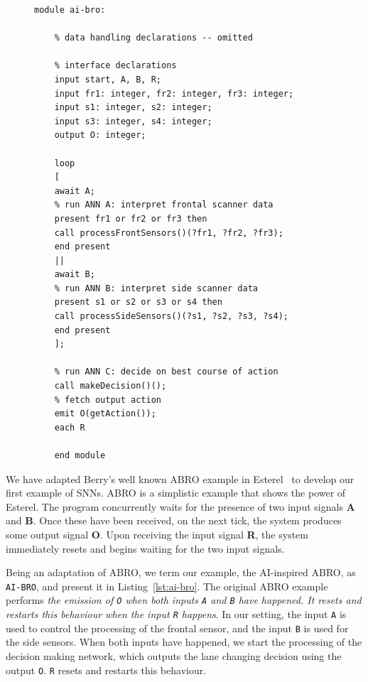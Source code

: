 \begin{figure}[h]
	\begin{lstlisting}[caption={Esterel implementation of \texttt{AI-BRO}},label={lst:ai-bro}]
	module ai-bro:
	
	% data handling declarations -- omitted 
	
	% interface declarations
	input start, A, B, R;
	input fr1: integer, fr2: integer, fr3: integer;
	input s1: integer, s2: integer;
	input s3: integer, s4: integer;
	output O: integer;
	
	loop
	[
	await A;
	% run ANN A: interpret frontal scanner data
	present fr1 or fr2 or fr3 then
	call processFrontSensors()(?fr1, ?fr2, ?fr3);
	end present
	||
	await B;
	% run ANN B: interpret side scanner data
	present s1 or s2 or s3 or s4 then
	call processSideSensors()(?s1, ?s2, ?s3, ?s4);
	end present
	];
	
	% run ANN C: decide on best course of action 
	call makeDecision()();
	% fetch output action
	emit O(getAction());
	each R
	
	end module
	\end{lstlisting}
\end{figure}

We have adapted Berry's well known ABRO example in Esterel~\cite{berry2000foundations} to develop our first example of 
\acp{SNN}.
ABRO is a simplistic example that shows the power of Esterel.
The program concurrently waits for the presence of two input signals \textbf{A} and \textbf{B}.
Once these have been received, on the next tick, the system produces some output signal \textbf{O}.
Upon receiving the input signal \textbf{R}, the system immediately resets and begins waiting for the two input signals.

Being an adaptation of ABRO, we term our example, the AI-inspired ABRO, as \texttt{AI-BRO}, and present it in Listing~\ref{lst:ai-bro}.
The original ABRO example performs \emph{the emission of \texttt{O} when both inputs \texttt{A} and \texttt{B} 
	have happened. It resets and restarts this behaviour when the input \texttt{R} happens}. In our setting, the input 
\texttt{A} is used to control the processing of the frontal sensor, and the input \texttt{B} is used for the side sensors.
When both inputs have happened, we start the processing of the decision making network, which outputs the 
lane changing decision using the output \texttt{O}. \texttt{R} resets and restarts this behaviour.

